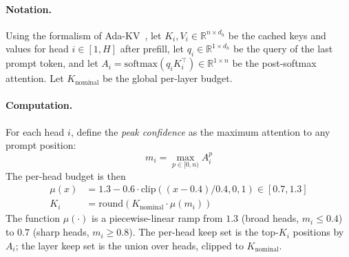 \documentclass[sigconf, anonymous=false, screen=true]{acmart}
\begin{document}
\paragraph{Notation.} Using the formalism of Ada-KV~\cite{feng2025adakv}, let $K_i, V_i \in \mathbb{R}^{n \times d_h}$ be the cached keys and values for head $i \in [1, H]$ after prefill, let $q_i \in \mathbb{R}^{1 \times d_h}$ be the query of the last prompt token, and let $A_i = \mathrm{softmax}(q_i K_i^\top) \in \mathbb{R}^{1 \times n}$ be the post-softmax attention. Let $K_{\text{nominal}}$ be the global per-layer budget.

\paragraph{Computation.} For each head $i$, define the \emph{peak confidence} as the maximum attention to any prompt position:
\begin{equation}
m_i = \max_{p \in [0, n)} A_i^p
\end{equation}
The per-head budget is then
\begin{align}
\mu(x) &= 1.3 - 0.6 \cdot \mathrm{clip}((x - 0.4) / 0.4, 0, 1) \in [0.7, 1.3] \\
K_i &= \mathrm{round}(K_{\text{nominal}} \cdot \mu(m_i))
\end{align}
The function $\mu(\cdot)$ is a piecewise-linear ramp from $1.3$ (broad heads, $m_i \le 0.4$) to $0.7$ (sharp heads, $m_i \ge 0.8$). The per-head keep set is the top-$K_i$ positions by $A_i$; the layer keep set is the union over heads, clipped to $K_{\text{nominal}}$.
\end{document}
